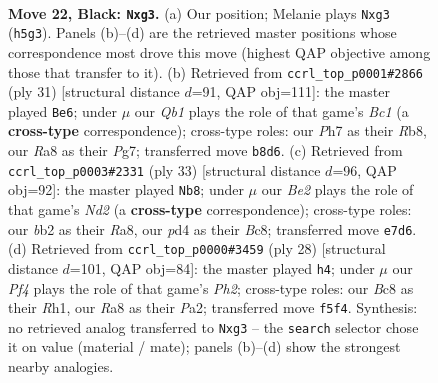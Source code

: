 \documentclass[11pt]{article}
\begin{document}
\clearpage

\begin{figure}[p]\centering
\begin{subfigure}{0.46\textwidth}\centering
\resizebox{\linewidth}{!}{%
\newchessgame
\chessboard[
  setfen={rqb1k2r/p3b1pp/1p6/n2p1p1n/Pp1P3P/4P1PB/RBQN1P2/1N2R1K1 b - - 8 22},
  showmover=false,
  pgfstyle=straightmove, color=movearrow, markmove={h5-g3}
]}
\caption{}
\end{subfigure}\hfill
\begin{subfigure}{0.46\textwidth}\centering
\resizebox{\linewidth}{!}{%
\newchessgame
\chessboard[
  setfen={1rb1k2r/4bpp1/p2p1n1p/q3p3/1p2P1PP/5P2/PPPQNB2/1K1R1B1R b k - 1 16},
  showmover=false,
  pgfstyle=straightmove, color=movearrow, markmove={c8-e6}
]}
\caption{}
\end{subfigure}
\\[4pt]
\begin{subfigure}{0.46\textwidth}\centering
\resizebox{\linewidth}{!}{%
\newchessgame
\chessboard[
  setfen={r1b1k2r/p2n1ppp/1q2p3/3pP3/1ppP1P1P/8/P1QNN1P1/R3KB1R b KQkq - 0 17},
  showmover=false,
  pgfstyle=straightmove, color=movearrow, markmove={d7-b8}
]}
\caption{}
\end{subfigure}\hfill
\begin{subfigure}{0.46\textwidth}\centering
\resizebox{\linewidth}{!}{%
\newchessgame
\chessboard[
  setfen={2r1k2r/ppqnbpp1/2n1p1p1/3p4/3P2P1/1QN1PP2/PP1B3P/1K1R1B1R w k - 4 15},
  showmover=false,
  pgfstyle=straightmove, color=movearrow, markmove={h2-h4}
]}
\caption{}
\end{subfigure}
\caption{\textbf{Move 22, Black: \texttt{Nxg3}.} (a) Our position; Melanie plays \texttt{Nxg3} (\texttt{h5g3}). Panels (b)--(d) are the retrieved master positions whose correspondence most drove this move (highest QAP objective among those that transfer to it). (b) Retrieved from \texttt{ccrl\_top\_p0001\#2866} (ply 31) [structural distance $d$=91, QAP obj=111]: the master played \texttt{Be6}; under $\mu$ our \emph{Qb1} plays the role of that game's \emph{Bc1} (a \textbf{cross-type} correspondence); cross-type roles: our \emph{P}h7 as their \emph{R}b8, our \emph{R}a8 as their \emph{P}g7; transferred move \texttt{b8d6}. (c) Retrieved from \texttt{ccrl\_top\_p0003\#2331} (ply 33) [structural distance $d$=96, QAP obj=92]: the master played \texttt{Nb8}; under $\mu$ our \emph{Be2} plays the role of that game's \emph{Nd2} (a \textbf{cross-type} correspondence); cross-type roles: our \emph{b}b2 as their \emph{R}a8, our \emph{p}d4 as their \emph{B}c8; transferred move \texttt{e7d6}. (d) Retrieved from \texttt{ccrl\_top\_p0000\#3459} (ply 28) [structural distance $d$=101, QAP obj=84]: the master played \texttt{h4}; under $\mu$ our \emph{Pf4} plays the role of that game's \emph{Ph2}; cross-type roles: our \emph{B}c8 as their \emph{R}h1, our \emph{R}a8 as their \emph{P}a2; transferred move \texttt{f5f4}. Synthesis: no retrieved analog transferred to \texttt{Nxg3} -- the \texttt{search} selector chose it on value (material / mate); panels (b)--(d) show the strongest nearby analogies.}
\label{fig:thought-m43}
\end{figure}
\end{document}
